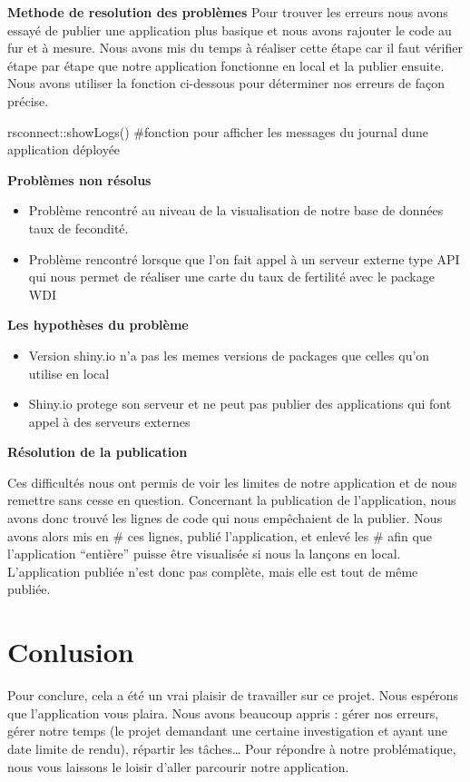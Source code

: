 \documentclass[
]{article}
\newenvironment{Shaded}{}{}
\newcommand{\CommentTok}[1]{\textcolor[rgb]{0.00,0.50,0.00}{#1}}
\newcommand{\FunctionTok}[1]{#1}
\newcommand{\NormalTok}[1]{#1}
\newcommand{\SpecialCharTok}[1]{\textcolor[rgb]{0.00,0.50,0.50}{#1}}
\providecommand{\tightlist}{%
  \setlength{\itemsep}{0pt}\setlength{\parskip}{0pt}}
\begin{document}
\textbf{Methode de resolution des problèmes} \newline Pour trouver les
erreurs nous avons essayé de publier une application plus basique et
nous avons rajouter le code au fur et à mesure. Nous avons mis du temps
à réaliser cette étape car il faut vérifier étape par étape que notre
application fonctionne en local et la publier ensuite. Nous avons
utiliser la fonction ci-dessous pour déterminer nos erreurs de façon
précise.

\begin{Shaded}
\begin{Highlighting}[]
\NormalTok{rsconnect}\SpecialCharTok{::}\FunctionTok{showLogs}\NormalTok{() }\CommentTok{\#fonction pour afficher les messages du journal d\textquotesingle{}une application déployée}
\end{Highlighting}
\end{Shaded}

\textbf{Problèmes non résolus}

\begin{itemize}
\tightlist
\item
  Problème rencontré au niveau de la visualisation de notre base de
  données taux de fecondité.
\item
  Problème rencontré lorsque que l'on fait appel à un serveur externe
  type API qui nous permet de réaliser une carte du taux de fertilité
  avec le package WDI
\end{itemize}

\textbf{Les hypothèses du problème}

\begin{itemize}
\tightlist
\item
  Version shiny.io n'a pas les memes versions de packages que celles
  qu'on utilise en local
\item
  Shiny.io protege son serveur et ne peut pas publier des applications
  qui font appel à des serveurs externes
\end{itemize}

\textbf{Résolution de la publication}

Ces difficultés nous ont permis de voir les limites de notre application
et de nous remettre sans cesse en question. Concernant la publication de
l'application, nous avons donc trouvé les lignes de code qui nous
empêchaient de la publier. Nous avons alors mis en \# ces lignes, publié
l'application, et enlevé les \# afin que l'application ``entière''
puisse être visualisée si nous la lançons en local. L'application
publiée n'est donc pas complète, mais elle est tout de même publiée.

\hypertarget{conlusion}{%
\section{Conlusion}\label{conlusion}}

Pour conclure, cela a été un vrai plaisir de travailler sur ce projet.
Nous espérons que l'application vous plaira. Nous avons beaucoup appris
: gérer nos erreurs, gérer notre temps (le projet demandant une certaine
investigation et ayant une date limite de rendu), répartir les
tâches\ldots{} Pour répondre à notre problématique, nous vous laissons
le loisir d'aller parcourir notre application.
\end{document}
